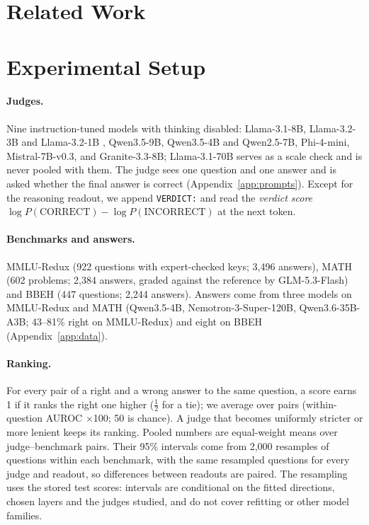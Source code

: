 \documentclass[11pt]{article}
\begin{document}
\section{Related Work}
\label{sec:related}


\section{Experimental Setup}
\label{sec:setup}

\paragraph{Judges.} Nine instruction-tuned models with thinking disabled: Llama-3.1-8B, Llama-3.2-3B and Llama-3.2-1B \citep{grattafiori2024llama3}, Qwen3.5-9B, Qwen3.5-4B and Qwen2.5-7B, Phi-4-mini, Mistral-7B-v0.3, and Granite-3.3-8B; Llama-3.1-70B serves as a scale check and is never pooled with them. The judge sees one question and one answer and is asked whether the final answer is correct (Appendix~\ref{app:prompts}). Except for the reasoning readout, we append \texttt{VERDICT:} and read the \emph{verdict score} $\log P(\text{CORRECT}) - \log P(\text{INCORRECT})$ at the next token.

\paragraph{Benchmarks and answers.} MMLU-Redux \citep{gema-etal-2025-done} (922 questions with expert-checked keys; 3,496 answers), MATH \citep{hendrycks2021math} (602 problems; 2,384 answers, graded against the reference by GLM-5.3-Flash) and BBEH \citep{kazemi-etal-2025-big} (447 questions; 2,244 answers). Answers come from three models on MMLU-Redux and MATH (Qwen3.5-4B, Nemotron-3-Super-120B, Qwen3.6-35B-A3B; 43--81\% right on MMLU-Redux) and eight on BBEH (Appendix~\ref{app:data}).

\paragraph{Ranking.} For every pair of a right and a wrong answer to the same question, a score earns 1 if it ranks the right one higher ($\frac12$ for a tie); we average over pairs (within-question AUROC $\times$100; 50 is chance). A judge that becomes uniformly stricter or more lenient keeps its ranking. Pooled numbers are equal-weight means over judge--benchmark pairs. Their 95\% intervals come from 2,000 resamples of questions within each benchmark, with the same resampled questions for every judge and readout, so differences between readouts are paired. The resampling uses the stored test scores: intervals are conditional on the fitted directions, chosen layers and the judges studied, and do not cover refitting or other model families.
\end{document}
